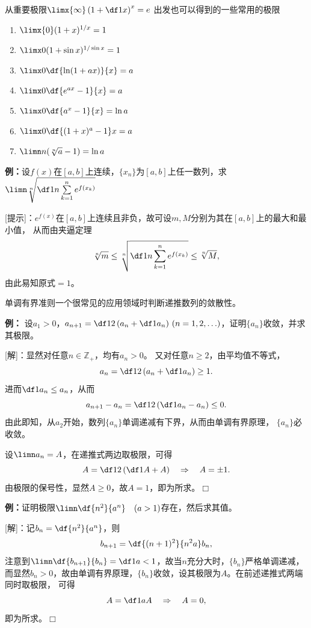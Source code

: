 从重要极限$\limx{\infty}\left(1+\df1x\right)^x=e$
出发也可以得到的一些常用的极限
\begin{thx}
\begin{enumerate}[(1)]
  \item $\limx{0}(1+x)^{1/x}=1$ 
  \item $\limx 0(1+\sin x)^{1/\sin x}=1$ 
  \item $\limx 0\df{\ln(1+ax)}{x}=a$
  \item $\limx 0\df{e^{ax}-1}{x}=a$ 
  \item $\limx 0\df{a^x-1}{x}=\ln a$ 
  \item $\limx 0\df{(1+x)^a-1}x=a$
  \item $\limn n(\sqrt[n]{a}-1)=\ln a$ 
\end{enumerate}
\end{thx}

{\bf 例：}设$f(x)$在$[a,b]$上连续，$\{x_n\}$为$[a,b]$上任一数列，求
$\limn\sqrt[n]{\df1n\sum\limits_{k=1}^ne^{f(x_k)}}$

[提示]：$e^{f(x)}$在$[a,b]$上连续且非负，故可设$m,M$分别为其在$[a,b]$上的最大和最小值，
从而由夹逼定理
$$\sqrt[n]m\leq\sqrt[n]{\df1n\sum\limits_{k=1}^ne^{f(x_k)}}\leq\sqrt[n]M,$$
由此易知原式$=1$。

单调有界准则一个很常见的应用领域时判断递推数列的敛散性。

{\bf 例：}
设$a_1>0$，$a_{n+1}=\df 12\left(a_n+\df 1{a_n}\right)\,
(n=1,2,\ldots)$，证明$\{a_n\}$收敛，并求其极限。

[解]：显然对任意$n\in\mathbb{Z}_+$，均有$a_n>0$。
又对任意$n\geq2$，由平均值不等式，
$$a_n=\df 12\left(a_n+\df 1{a_n}\right)\geq 1.$$
% 
% 
% 
进而$\df1{a_n}\leq a_n$，从而
$$a_{n+1}-a_n=\df12\left(\df1{a_n}-a_n\right)\leq0.$$
由此即知，从$a_2$开始，数列$\{a_n\}$单调递减有下界，从而由单调有界原理，
$\{a_n\}$必收敛。

设$\limn a_n=A$，在递推式两边取极限，可得
$$A=\df12\left(\df1A+A\right)\quad\Rightarrow\quad A=\pm1.$$
由极限的保号性，显然$A\geq0$，故$A=1$，即为所求。\hfill$\Box$

{\bf 例：}证明极限$\limn\df{n^2}{a^n}\quad (a>1)$存在，然后求其值。

[解]：记$b_n=\df{n^2}{a^n}$，则
$$b_{n+1}=\df{(n+1)^2}{n^2a}b_n,$$
注意到$\limn\df{b_{n+1}}{b_n}=\df1a<1$，故当$n$充分大时，$\{b_n\}$严格单调递减，
而显然$b_n>0$，故由单调有界原理，$\{b_n\}$收敛，设其极限为$A$。在前述递推式两端同时取极限，
可得
$$A=\df1aA\quad\Rightarrow\quad A=0,$$
即为所求。$\Box$

